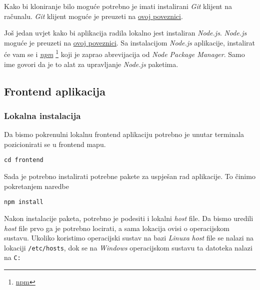		    Kako bi kloniranje bilo moguće potrebno je imati instalirani \textit{Git} klijent na računalu. \textit{Git} klijent moguće je preuzeti na \underline{\href{https://git-scm.com/downloads}{ovoj poveznici}}.
		    
		    Još jedan uvjet kako bi aplikacija radila lokalno jest instaliran \textit{Node.js}. \textit{Node.js} moguće je preuzeti na \underline{\href{https://nodejs.org/en/download/}{ovoj poveznici}}. Sa instalacijom \textit{Node.js} aplikacije, instalirat će vam se i \textit{\underline{npm}} \footnote{\href{https://www.npmjs.com/}{npm}} koji je zaprao abrevijacija od \textit{Node Package Manager}. Samo ime govori da je to alat za upravljanje \textit{Node.js} paketima.

		        
		    \pagebreak
		
	        \subsection{Frontend aplikacija}
	        
	        \subsubsection*{Lokalna instalacija}
	        
	            Da bismo pokrenulni lokalnu frontend aplikaciju potrebno je unutar terminala pozicionirati se u frontend mapu. 
	            
		        \begin{center}
	                \texttt{cd frontend}
		        \end{center}
		        
		        Sada je potrebno instalirati potrebne pakete za uspješan rad aplikacije. To činimo pokretanjem naredbe
		        
		        \begin{center}
	                \texttt{npm install}
		        \end{center}
		        
		        Nakon instalacije paketa, potrebno je podesiti i lokalni \textit{host} file. Da bismo uredili \textit{host} file prvo ga je potrebno locirati, a sama lokacija ovisi o operacijskom sustavu. Ukoliko koristimo operacijski sustav na bazi \textit{Linuxa} \textit{host} file se nalazi na lokaciji \texttt{/etc/hosts}, dok se na \textit{Windows} operacijskom sustavu ta datoteka nalazi na \texttt{C:\Windows{}\drivers\etc\hosts}
		        
